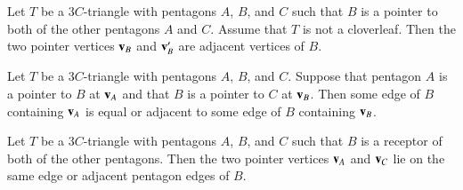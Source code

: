 \begin{lemma} 
Let $T$ be a $3C$-triangle with pentagons $A$, $B$, and $C$ such that
$B$ is a pointer to both of the other pentagons $A$ and $C$.  
Assume that $T$ is not a cloverleaf.
Then the two pointer vertices ${\mathbf v}_B$ and ${\mathbf v}_B'$ are adjacent
vertices of $B$.
\end{lemma}

\begin{lemma}  
Let $T$ be a $3C$-triangle with pentagons $A$, $B$, and $C$.  Suppose
that pentagon $A$ is a pointer to $B$ at ${\mathbf v}_A$ and that $B$ is a
pointer to $C$ at ${\mathbf v}_B$.  Then some edge of $B$ containing ${\mathbf v}_A$ is
equal or adjacent to some edge of $B$ containing ${\mathbf v}_B$.
\end{lemma}

\begin{lemma} 
  Let $T$ be a $3C$-triangle with pentagons $A$, $B$, and $C$ such
  that $B$ is a receptor of both of the other pentagons.  Then the two
  pointer vertices ${\mathbf v}_A$ and ${\mathbf v}_C$ lie on the same edge or adjacent
  pentagon edges of $B$.
\end{lemma}


